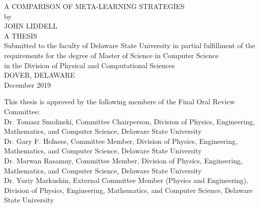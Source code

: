 \begin{titlepage}
  \begin{center}
      A COMPARISON OF META-LEARNING STRATEGIES\\
      \vspace{17mm}
      by\\
      \vspace{10mm}
      JOHN LIDDELL\\
      \vspace{35mm}
      A THESIS\\
      \vspace{7mm}
      Submitted to the faculty of Delaware State University in partial fulfillment of the\\
      requirements for the degree of Master of Science in Computer Science\\
      in the Division of Physical and Computational Sciences\\
      \vspace{7mm}
      DOVER, DELAWARE\\
      December 2019\\
  \end{center}

  \vspace{15mm}

  \begin{flushleft}
    This thesis is approved by the following members of the Final Oral Review Committee:\\
    \vspace{6mm}
    Dr. Tomasz Smolinski, Committee Chairperson, Division of Physics, Engineering, Mathematics, and Computer Science, Delaware State University\\
    \vspace{3mm}
    Dr. Gary F. Holness, Committee Member, Division of Physics, Engineering, Mathematics, and Computer Science, Delaware State University\\
    \vspace{3mm}
    Dr. Marwan Rasamny, Committee Member, Division of Physics, Engineering, Mathematics, and Computer Science, Delaware State University\\
    \vspace{3mm}
    Dr. Yuriy Markushin, External Committee Member (Physics and Engineering), Division of Physics, Engineering, Mathematics, and Computer Science, Delaware State University\\
  \end{flushleft}
\end{titlepage}
